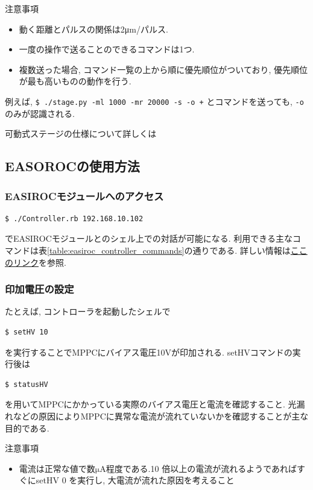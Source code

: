 \begin{itembox}[l]{注意事項}
  \begin{itemize}
    \item 動く距離とパルスの関係は2μm/パルス.
    \item 一度の操作で送ることのできるコマンドは1つ.
    \item 複数送った場合, コマンド一覧の上から順に優先順位がついており, 優先順位が最も高いものの動作を行う.
  \end{itemize}
  例えば, {\tt \$ ./stage.py -ml 1000 -mr 20000 -s -o +} とコマンドを送っても, {\tt -o} のみが認識される.
\end{itembox}

可動式ステージの仕様について詳しくは\cite{movingstage}


\subsection{EASOROCの使用方法}

\subsubsection{EASIROCモジュールへのアクセス}
\begin{lstlisting}
$ ./Controller.rb 192.168.10.102
\end{lstlisting}
でEASIROCモジュールとのシェル上での対話が可能になる.
利用できる主なコマンドは表\ref{table:easiroc_controller_commands}の通りである.
詳しい情報は\href{https://ppwww.phys.sci.kobe-u.ac.jp/~hamada/easiroc_manual.html}{ここのリンク}を参照.

\subsubsection{印加電圧の設定}

たとえば, コントローラを起動したシェルで
\begin{lstlisting}
$ setHV 10
\end{lstlisting}
を実行することでMPPCにバイアス電圧10Vが印加される.
setHVコマンドの実行後は
\begin{lstlisting}
$ statusHV
\end{lstlisting}
を用いてMPPCにかかっている実際のバイアス電圧と電流を確認すること.
光漏れなどの原因によりMPPCに異常な電流が流れていないかを確認することが主な目的である.

\begin{itembox}[l]{注意事項}
  \begin{itemize}
    \item 電流は正常な値で数$\mathrm{\mu A}$程度である.10 倍以上の電流が流れるようであればすぐにsetHV 0 を実行し, 大電流が流れた原因を考えること
  \end{itemize}
\end{itembox}

